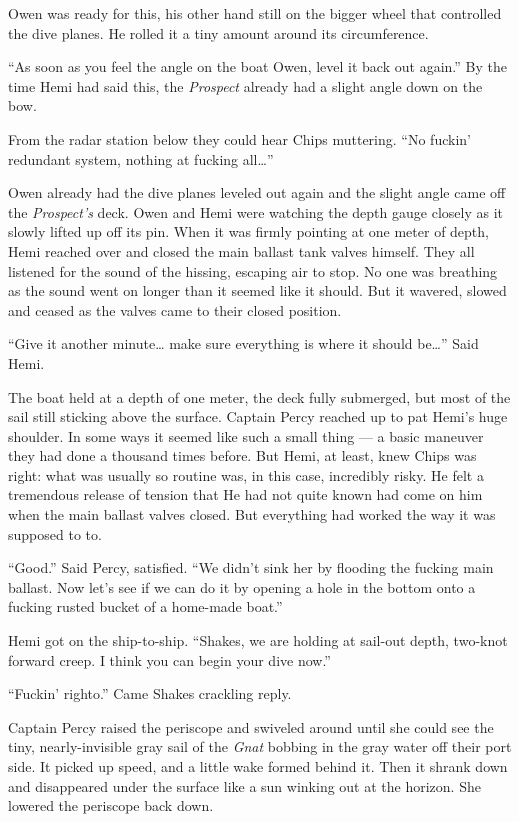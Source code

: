 \documentclass[]{scrbook}
\begin{document}
Owen was ready for this, his other hand still on the bigger wheel that
controlled the dive planes. He rolled it a tiny amount around its
circumference.

``As soon as you feel the angle on the boat Owen, level it back out
again.'' By the time Hemi had said this, the \emph{Prospect} already had
a slight angle down on the bow.

From the radar station below they could hear Chips muttering. ``No
fuckin' redundant system, nothing at fucking all\ldots{}''

Owen already had the dive planes leveled out again and the slight angle
came off the \emph{Prospect's} deck. Owen and Hemi were watching the
depth gauge closely as it slowly lifted up off its pin. When it was
firmly pointing at one meter of depth, Hemi reached over and closed the
main ballast tank valves himself. They all listened for the sound of the
hissing, escaping air to stop. No one was breathing as the sound went on
longer than it seemed like it should. But it wavered, slowed and ceased
as the valves came to their closed position.

``Give it another minute\ldots{} make sure everything is where it should
be\ldots{}'' Said Hemi.

The boat held at a depth of one meter, the deck fully submerged, but
most of the sail still sticking above the surface. Captain Percy reached
up to pat Hemi's huge shoulder. In some ways it seemed like such a small
thing --- a basic maneuver they had done a thousand times before. But
Hemi, at least, knew Chips was right: what was usually so routine was,
in this case, incredibly risky. He felt a tremendous release of tension
that He had not quite known had come on him when the main ballast valves
closed. But everything had worked the way it was supposed to to.

``Good.'' Said Percy, satisfied. ``We didn't sink her by flooding the
fucking main ballast. Now let's see if we can do it by opening a hole in
the bottom onto a fucking rusted bucket of a home-made boat.''

Hemi got on the ship-to-ship. ``Shakes, we are holding at sail-out
depth, two-knot forward creep. I think you can begin your dive now.''

``Fuckin' righto.'' Came Shakes crackling reply.

Captain Percy raised the periscope and swiveled around until she could
see the tiny, nearly-invisible gray sail of the \emph{Gnat} bobbing in
the gray water off their port side. It picked up speed, and a little
wake formed behind it. Then it shrank down and disappeared under the
surface like a sun winking out at the horizon. She lowered the periscope
back down.
\end{document}
